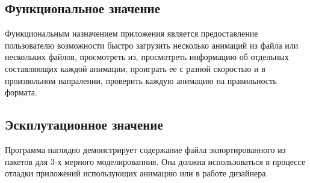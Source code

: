 \subsection{Функциональное значение}
Функциональным назначением приложения является предоставление пользователю возможности быстро загрузить несколько анимаций из файла или нескольких файлов, просмотреть из, просмотреть информацию об отдельных составляющих каждой анимации, проиграть ее с разной скоростью и в произвольном напралении, проверить каждую анимацию на правильность формата.

\subsection{Эскплутационное значение}
Программа наглядно демонстрирует содержание файла экпортированного из пакетов для 3-х мерного моделированния. Она должна использоваться в процессе отладки приложений использующих анимацию или в работе дизайнера.
